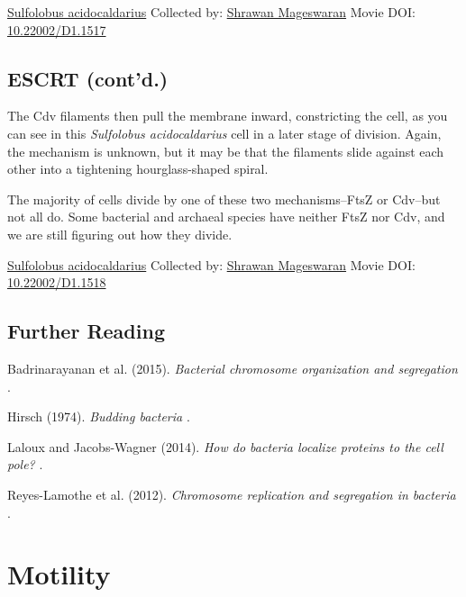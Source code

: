 \documentclass[]{tufte-book}
\begin{document}
\hypertarget{htmlwidget-feffa25326d1e7547b98}{}

\label{fig:5-11}\protect\hyperlink{tree}{Sulfolobus acidocaldarius} Collected by: \protect\hyperlink{shrawan_mageswaran}{Shrawan Mageswaran} Movie DOI: \href{https://doi.org/10.22002/D1.1517}{10.22002/D1.1517}

\hypertarget{escrt-contd.}{%
\section{ESCRT (cont'd.)}\label{escrt-contd.}}

The Cdv filaments then pull the membrane inward, constricting the cell, as you can see in this \emph{Sulfolobus acidocaldarius} cell in a later stage of division. Again, the mechanism is unknown, but it may be that the filaments slide against each other into a tightening hourglass-shaped spiral.

The majority of cells divide by one of these two mechanisms--FtsZ or Cdv--but not all do. Some bacterial and archaeal species have neither FtsZ nor Cdv, and we are still figuring out how they divide.



\hypertarget{htmlwidget-f70308cd26ff79e82fe2}{}

\label{fig:5-12}\protect\hyperlink{tree}{Sulfolobus acidocaldarius} Collected by: \protect\hyperlink{shrawan_mageswaran}{Shrawan Mageswaran} Movie DOI: \href{https://doi.org/10.22002/D1.1518}{10.22002/D1.1518}

\hypertarget{further-reading-4}{%
\section{Further Reading}\label{further-reading-4}}

Badrinarayanan et al. (2015). \emph{Bacterial chromosome organization and segregation} \citep{badrinarayanan2015}.

Hirsch (1974). \emph{Budding bacteria} \citep{hirsch1974}.

Laloux and Jacobs-Wagner (2014). \emph{How do bacteria localize proteins to the cell pole?} \citep{laloux2014}.

Reyes-Lamothe et al. (2012). \emph{Chromosome replication and segregation in bacteria} \citep{reyes-lamothe2012}.

\hypertarget{motility}{%
\chapter{Motility}\label{motility}}
\end{document}
